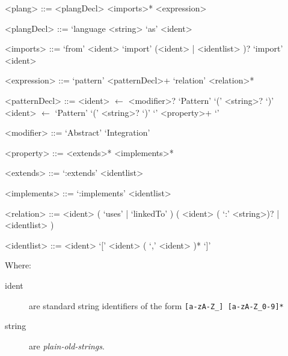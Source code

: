 
\usepackage{syntax}


\maketitle

\begin{grammar}
<plang> ::= <plangDecl> <imports>* <expression>


<plangDecl> ::= `language <string> `as' <ident>


<imports> ::= `from' <ident> `import' (<ident> | <identlist> )?
  \alt `import' <ident>


<expression> ::= `pattern' <patternDecl>+ `relation' <relation>*

<patternDecl> ::= <ident> $\leftarrow$ <modifier>? `Pattern' `(' <string>? `)'
\alt <ident> $\leftarrow$ `Pattern' `(' <string>? `)' `{' <property>+ `}'

<modifier> ::= `Abstract' \alt `Integration'

<property> ::= <extends>* <implements>*

<extends> ::= `:extends' <identlist>

<implements> ::= `:implements' <identlist>

<relation> ::= <ident> ( `uses' | `linkedTo' ) ( <ident> ( `:' <string>)? | <identlist> )

<identlist> ::= <ident>  \alt `[' <ident> ( `,' <ident> )* `]'

\end{grammar}

\noindent
Where:

\begin{description}
\item[ident]
are standard string identifiers of the form \verb+[a-zA-Z_] [a-zA-Z_0-9]*+

\item[string]
are \emph{plain-old-strings}.
\end{description}


